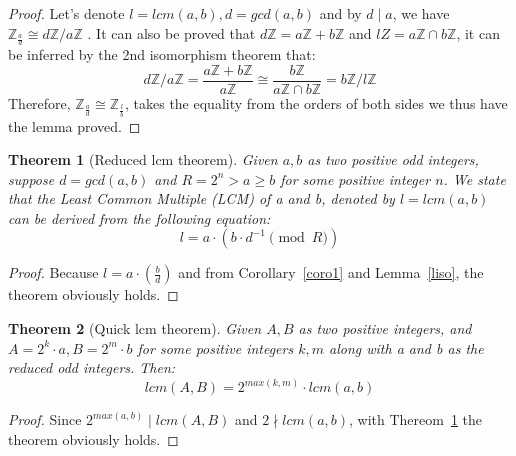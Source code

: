 \documentclass{article}
\newtheorem{theorem}{Theorem}[section]
\begin{document}
    \begin{proof}
        Let's denote \(l=lcm(a,b), d=gcd(a,b)\) and by \(d \mid a\), we have \( \mathbb{Z}_\frac{a}{d} \cong d\mathbb{Z}/a\mathbb{Z} \)
        . It
        can also be proved that \(d\mathbb{Z} = a\mathbb{Z} + b\mathbb{Z}\) and \(lZ = a\mathbb{Z} \cap b\mathbb{Z} \), it can be inferred
        by the 2nd isomorphism theorem that:
        \[ d\mathbb{Z}/a\mathbb{Z} = \dfrac{a\mathbb{Z} + b\mathbb{Z}}{a\mathbb{Z}} \cong \dfrac{b\mathbb{Z}}{a\mathbb{Z} \cap b\mathbb{Z}} = b\mathbb{Z}/l\mathbb{Z} \]
        Therefore, \(\mathbb{Z}_\frac{a}{d} \cong \mathbb{Z}_\frac{l}{b} \), takes the equality from the orders of
        both sides we thus
        have
        the lemma proved.
    \end{proof}

    \begin{theorem}[Reduced lcm theorem]
        \label{rlcm}
        Given \(a, b\) as two positive odd integers, suppose \(d=gcd(a,b)\) and \(R=2^n > a \geq b\) for some
        positive integer \(n\). We state that the Least Common Multiple (LCM) of a and b, denoted by \(l=lcm(a,b)\)
        can be derived from the following equation:
        \[ l=a \cdot (b \cdot d^{-1} \pmod{R}) \]
    \end{theorem}

    \begin{proof}
        Because \(l=a \cdot (\frac{b}{d})\) and from Corollary~\ref{coro1} and Lemma~\ref{liso}, the theorem
        obviously
        holds.
    \end{proof}





    \begin{theorem}[Quick lcm theorem]
        Given \(A, B\) as two positive integers, and \(A=2^k \cdot a, B=2^m \cdot b\) for some positive integers
        \(k, m\) along with a and b as the reduced odd integers. Then:
        \[ lcm(A,B) = 2^{max(k, m)} \cdot lcm(a, b) \]
    \end{theorem}

    \begin{proof}
        Since \(2^{max(a, b)} \mid lcm(A, B)\) and \(2 \nmid lcm(a, b)\), with Thereom~\ref{rlcm} the theorem
        obviously holds.
    \end{proof}
\end{document}
